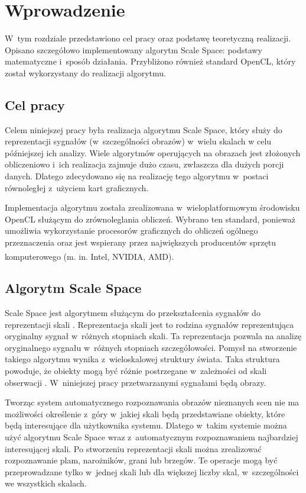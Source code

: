 \chapter{Wprowadzenie}
\label{cha:wprowadzenie}

W~tym rozdziale przedstawiono cel pracy oraz podstawę teoretyczną realizacji. Opisano szczegółowo implementowany algorytm Scale Space: podstawy matematyczne i~sposób działania. Przybliżono również standard OpenCL, który został wykorzystany do realizacji algorytmu.


\section{Cel pracy}
\label{sec:cel}
Celem niniejszej pracy była realizacja algorytmu Scale Space, który służy do reprezentacji sygnałów (w~szczególności obrazów) w~wielu skalach w celu późniejszej ich analizy.
Wiele algorytmów operujących na obrazach jest złożonych obliczeniowo i~ich realizacja zajmuje dużo czasu, zwłaszcza dla dużych porcji danych. Dlatego zdecydowano się na realizację tego algorytmu w~postaci równoległej z~użyciem kart graficznych.

Implementacja algorytmu została zrealizowana w~wieloplatformowym środowisku OpenCL \cite{OpenCL} służącym do zrównoleglania obliczeń. Wybrano ten standard, ponieważ umożliwia wykorzystanie procesorów graficznych do obliczeń ogólnego przeznaczenia oraz jest wspierany przez największych producentów sprzętu komputerowego (m. in. Intel\textsuperscript{\textregistered}, NVIDIA\textsuperscript{\texttrademark}, AMD).

\section{Algorytm Scale Space}
\label{sec:algorytm}
Scale Space jest algorytmem służącym do przekształcenia sygnałów do reprezentacji skali \cite{SSFramework}. Reprezentacja skali jest to rodzina sygnałów reprezentująca oryginalny sygnał w~różnych stopniach skali.
Ta reprezentacja pozwala na analizę oryginalnego sygnału w~różnych stopniach szczegółowości.
Pomysł na stworzenie takiego algorytmu wynika z~wieloskalowej struktury świata. Taka struktura powoduje, że obiekty mogą być różnie postrzegane w~zależności od skali obserwacji \cite{Enc09}.
W~niniejszej pracy przetwarzanymi sygnałami będą obrazy.

Tworząc system automatycznego rozpoznawania obrazów nieznanych scen nie ma możliwości określenie z~góry w~jakiej skali będą przedstawiane obiekty, które będą interesujące dla użytkownika systemu. Dlatego w~takim systemie można użyć algorytmu Scale Space wraz z~automatycznym rozpoznawaniem najbardziej interesującej skali. Po stworzeniu reprezentacji skali można zrealizować rozpoznawanie plam, narożników, grani lub brzegów. Te operacje mogą być przeprowadzane tylko w~jednej skali lub dla większej liczby skal, w~szczególności we wszystkich skalach.

